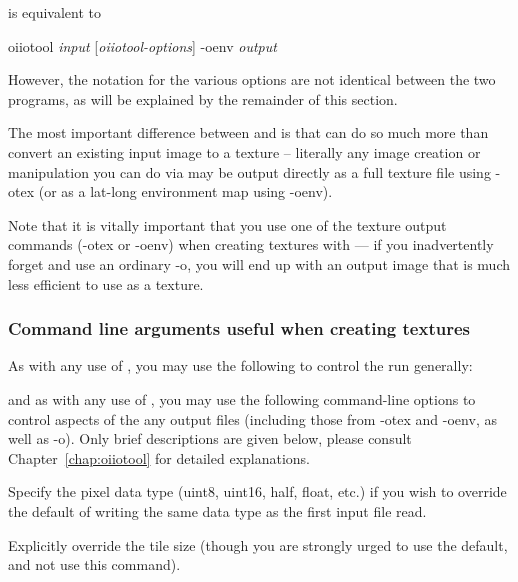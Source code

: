 \medskip

\noindent is equivalent to

\medskip

\hspace{0.25in} {\cf oiiotool} \emph{input} [\emph{oiiotool-options}] {\cf -oenv} \emph{output}

\medskip

\noindent However, the notation for the various options are not identical
between the two programs, as will be explained by the remainder of this
section.

The most important difference between \oiiotool and \maketx is that
\oiiotool can do so much more than convert an existing input image to a
texture -- literally any image creation or manipulation you can do via
\oiiotool may be output directly as a full texture file using {\cf -otex}
(or as a lat-long environment map using {\cf -oenv}).

Note that it is vitally important that you use one of the texture output
commands ({\cf -otex} or {\cf -oenv}) when creating textures with \oiiotool
--- if you inadvertently forget and use an ordinary {\cf -o}, you will end
up with an output image that is much less efficient to use as a texture.

\subsubsection*{Command line arguments useful when creating textures}

As with any use of \oiiotool, you may use the following to control the
run generally:

\apiend

\noindent and as with any use of \oiiotool, you may use the following
command-line options to control aspects of the any output files (including
those from {\cf -otex} and {\cf -oenv}, as well as {\cf -o}). Only brief
descriptions are given below, please consult Chapter~\ref{chap:oiiotool} for
detailed explanations.

Specify the pixel data type ({\cf uint8}, {\cf uint16}, {\cf half}, {\cf float},
etc.) if you wish to override the default of writing the same data type as
the first input file read.
\apiend

Explicitly override the tile size (though you are strongly urged to use
the default, and not use this command).
\apiend

